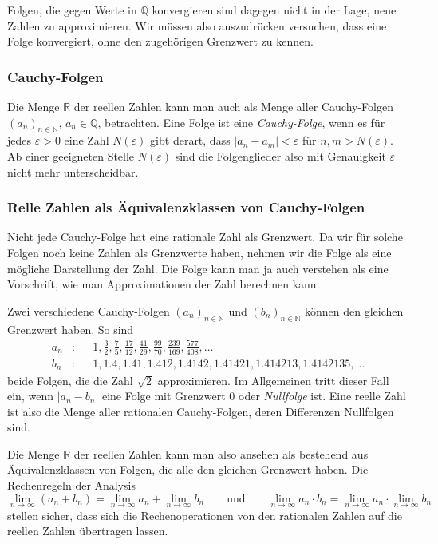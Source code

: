 Folgen, die gegen Werte in $\mathbb{Q}$ konvergieren sind dagegen
nicht in der Lage, neue Zahlen zu approximieren.
Wir müssen also auszudrücken versuchen, dass eine Folge konvergiert,
ohne den zugehörigen Grenzwert zu kennen.

\subsubsection{Cauchy-Folgen}
Die Menge $\mathbb{R}$ der reellen Zahlen kann man auch als Menge
aller Cauchy-Folgen $(a_n)_{n\in\mathbb{N}}$, $a_n\in\mathbb{Q}$,
betrachten.
%
Eine Folge ist eine {\em Cauchy-Folge}, wenn es für jedes $\varepsilon>0$
eine Zahl $N(\varepsilon)$ gibt derart, dass $|a_n-a_m|<\varepsilon$
für $n,m>N(\varepsilon)$.
Ab einer geeigneten Stelle $N(\varepsilon)$ sind die Folgenglieder also
mit Genauigkeit $\varepsilon$ nicht mehr unterscheidbar.


\subsubsection{Relle Zahlen als Äquivalenzklassen von Cauchy-Folgen}
Nicht jede Cauchy-Folge hat eine rationale Zahl als Grenzwert.
Da wir für solche Folgen noch keine Zahlen als Grenzwerte haben,
nehmen wir die Folge als eine mögliche Darstellung der Zahl.
Die Folge kann man ja auch verstehen als eine Vorschrift, wie man
Approximationen der Zahl berechnen kann.

Zwei verschiedene Cauchy-Folgen $(a_n)_{n\in\mathbb{N}}$ und
$(b_n)_{n\in\mathbb{N}}$ 
können den gleichen Grenzwert haben.
So sind 
\[
\begin{aligned}
a_n&\colon&&
1,\frac32,\frac75,\frac{17}{12},\frac{41}{29},\frac{99}{70},\frac{239}{169},
\frac{577}{408},\dots
\\
b_n&\colon&&
1,1.4,1.41,1.412,1.4142,1.41421,1.414213,1.4142135,\dots
\end{aligned}
\]
beide Folgen, die die Zahl $\sqrt{2}$ approximieren.
Im Allgemeinen tritt dieser Fall ein, wenn $|a_n-b_n|$ eine
Folge mit Grenzwert $0$ oder {\em Nullfolge} ist.
%
Eine reelle Zahl ist also die Menge aller rationalen Cauchy-Folgen,
deren Differenzen Nullfolgen sind.

Die Menge $\mathbb{R}$ der reellen Zahlen kann man also ansehen
als bestehend aus Äquivalenzklassen von Folgen, die alle den gleichen
Grenzwert haben.
Die Rechenregeln der Analysis 
\[
\lim_{n\to\infty} (a_n + b_n)
=
\lim_{n\to\infty} a_n +
\lim_{n\to\infty} b_n
\qquad\text{und}\qquad
\lim_{n\to\infty} a_n \cdot b_n
=
\lim_{n\to\infty} a_n \cdot
\lim_{n\to\infty} b_n 
\]
stellen sicher, dass sich die Rechenoperationen von den rationalen
Zahlen auf die reellen Zahlen übertragen lassen.




